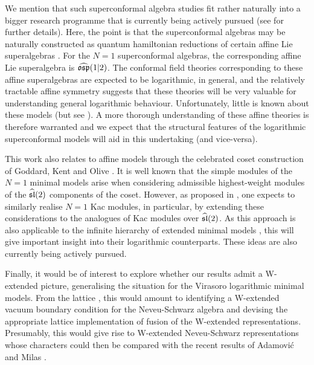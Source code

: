 \documentclass[a4paper,reqno,12pt]{report}
\theoremstyle{definition}
\numberwithin{equation}{section}
\let\originalleft\left     %
\let\originalright\right
\renewcommand{\left}{\mathopen{}\mathclose\bgroup\originalleft}
\renewcommand{\right}{\aftergroup\egroup\originalright}
\newcommand{\alg}[1]{\mathfrak{#1}} %
\newcommand{\affine}[1]{\widehat{#1}}
\newcommand{\AKMA}[2]{\affine{\alg{#1}} \left( #2 \right)}                  %
\newcommand{\AKMSA}[3]{\affine{\alg{#1}} \left( #2 \middle\vert #3 \right)} %
\newcommand{\cfts}{conformal field theories}
\newcommand{\hw}{highest-weight}
\newcommand{\hwms}{\hw{} modules}
\theoremstyle{plain}
\begin{document}
We mention that such superconformal algebra studies fit rather naturally into a bigger research programme that is currently being actively pursued (see \cite{RidRel15} for further details).  Here, the point is that the superconformal algebras may be naturally constructed as quantum hamiltonian reductions of certain affine Lie superalgebras \cite{KacQua03}.  For the $N=1$ superconformal algebras, the corresponding affine Lie superalgebra is $\AKMSA{osp}{1}{2}$.  The \cfts{} corresponding to these affine superalgebras are expected to be logarithmic, in general, and the relatively tractable affine symmetry suggests that these theories will be very valuable for understanding general logarithmic behaviour.  Unfortunately, little is known about these models (but see \cite{RozQua92,SalGL106,SalSU207,GotWZN07,CreRel11,CreWAl11}).  A more thorough understanding of these affine theories is therefore warranted and we expect that the structural features of the logarithmic superconformal models will aid in this undertaking (and vice-versa).

This work also relates to affine models through the celebrated coset construction of Goddard, Kent and Olive \cite{GKO85,GKO86}.  It is well known that the simple modules of the $N=1$ minimal models arise when considering admissible \hwms{} \cite{KacWak88,KacWak89} of the $\AKMA{sl}{2}$ components of the coset.  However, as proposed in \cite{PRcoset13}, one expects to similarly realise $N=1$ Kac modules, in particular, by extending these considerations to the analogues of Kac modules over $\AKMA{sl}{2}$.  As this approach is also applicable to the infinite hierarchy of extended minimal models \cite{Date86,Date87a,Date87b,Ahn91,Ber97,MDPR14}, this will give important insight into their logarithmic counterparts. These ideas are also currently being actively pursued.

Finally, it would be of interest to explore whether our results admit a W-extended picture, generalising the
situation \cite{GabRat96,FeiLog06,ReaAss07,SemNot07,GabFus09,RasPol09,RasIrr10,WooFus10,RasWKac11,TsuTen12} for the Virasoro logarithmic minimal models. From the lattice \cite{PRR1p08,RPWperc08,RasWLM09}, this would amount to identifying a W-extended vacuum boundary condition for the Neveu-Schwarz algebra and devising the appropriate lattice implementation of fusion of the W-extended representations. Presumably, this would give rise to W-extended Neveu-Schwarz representations whose characters could then be compared with the recent results of Adamovi\'{c} and Milas \cite{AdaMil09,AdaMil08,AdaMil09b}.
\end{document}
